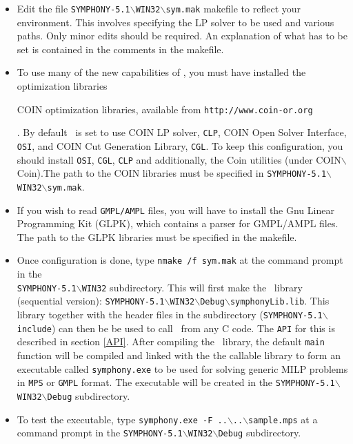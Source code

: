 \begin{itemize}

\item Edit the file
\texttt{SYMPHONY-5.1$\backslash$WIN32$\backslash$sym.mak} makefile to
reflect your environment. This involves specifying the LP solver to be used
and various paths. Only minor edits should be required. An explanation of what
has to be set is contained in the comments in the makefile.

\item To use many of the new capabilities of \BB, you must have installed
the \emph{} optimization
libraries
\begin{latexonly} 
COIN optimization libraries, available from
\texttt{http://www.coin-or.org} 
\end{latexonly}. By default \BB\ is 
set to use COIN LP solver, \texttt{CLP}, COIN Open Solver Interface, 
\texttt{OSI}, and COIN Cut Generation Library, \texttt{CGL}. To keep this 
configuration, you should install \texttt{OSI}, \texttt{CGL}, \texttt{CLP} 
and additionally, the Coin utilities (under COIN$\backslash$Coin).The path to 
the COIN libraries must be specified in 
\texttt{SYMPHONY-5.1$\backslash$WIN32$\backslash$sym.mak}.

\item If you wish to read \texttt{GMPL/AMPL} files, you will have to install the 
Gnu Linear Programming Kit (GLPK), which contains a parser for GMPL/AMPL
files. The path to the GLPK libraries must be specified in the makefile.

\item Once configuration is done, type \texttt{nmake /f sym.mak} at the
command prompt in the \\
\texttt{SYMPHONY-5.1$\backslash$WIN32} subdirectory. 
This will first make the \BB\ library (sequential version):
\texttt{SYMPHONY-5.1$\backslash$WIN32$\backslash$Debug$\backslash$symphonyLib.lib}. This library together with the header files in the subdirectory
(\texttt{SYMPHONY-5.1$\backslash$include}) can then be
be used to call \BB\ from any C code. The \texttt{API} for this is 
described in section \ref{API}.
After compiling the \BB\ library, the default \texttt{main} function will 
be compiled and linked with the the callable library to form an executable
called \texttt{symphony.exe} to be used for solving generic MILP problems 
in \texttt{MPS} or \texttt{GMPL} format. The executable will be created in the
\texttt{SYMPHONY-5.1$\backslash$WIN32$\backslash$Debug} subdirectory.

\item To test the executable, type \texttt{symphony.exe -F 
..$\backslash$..$\backslash$sample.mps} at a command prompt in the
\texttt{SYMPHONY-5.1$\backslash$WIN32$\backslash$Debug} subdirectory.

\end{itemize}

